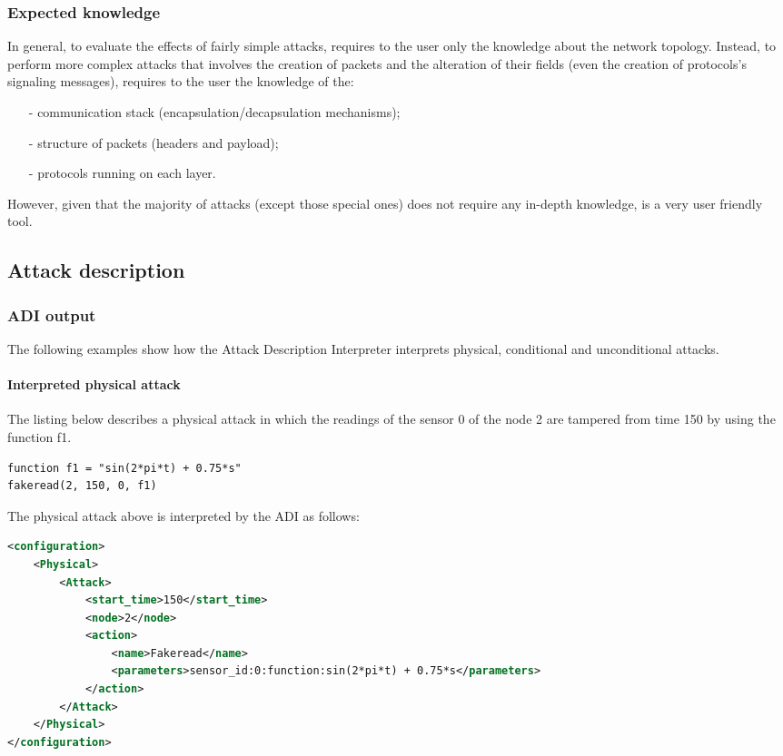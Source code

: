 \subsubsection{Expected knowledge}
In general, to evaluate the effects of fairly simple attacks, \asf requires to the user only the knowledge about the network topology.
Instead, to perform more complex attacks that involves the creation of packets and the alteration of their fields (even the creation of protocols's signaling messages), \asf requires to the user the knowledge of the:
%
\begin{itemize}
\item[-] communication stack (encapsulation/decapsulation mechanisms);
\item[-] structure of packets (headers and payload);
\item[-] protocols running on each layer.
\end{itemize}
%
However, given that the majority of attacks (except those special ones) does not require any in-depth knowledge, \asf is a very user friendly tool.


\subsection{Attack description}
\label{ss:attackdefinition}


\subsubsection{ADI output}
The following examples show how the Attack Description Interpreter interprets physical, conditional and unconditional attacks.

\paragraph{Interpreted physical attack}
The listing below describes a physical attack in which the readings of the sensor 0 of the node 2 are tampered from time 150 by using the function f1.
%
\begin{lstlisting}[language={adl}]
function f1 = "sin(2*pi*t) + 0.75*s"
fakeread(2, 150, 0, f1)
\end{lstlisting}
%
The physical attack above is interpreted by the ADI as follows:
%
\begin{lstlisting}[language={xml}]
<configuration>
    <Physical>
        <Attack>
            <start_time>150</start_time>
            <node>2</node>
            <action>
                <name>Fakeread</name>
                <parameters>sensor_id:0:function:sin(2*pi*t) + 0.75*s</parameters>
            </action>
        </Attack>
    </Physical>
</configuration>
\end{lstlisting}


